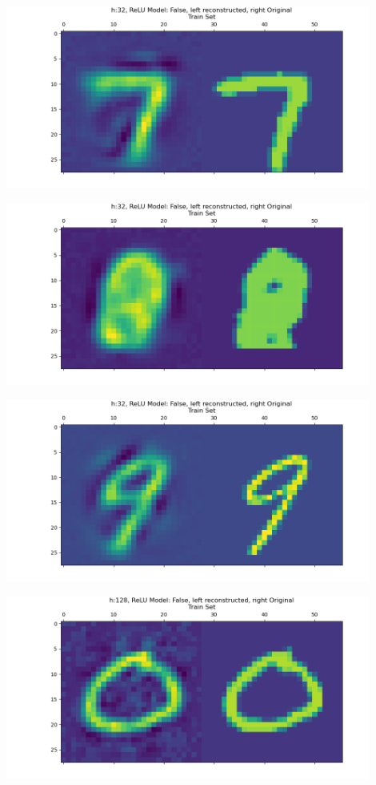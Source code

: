 \documentclass[]{article}
\begin{document}
            \begin{center}
                \includegraphics*[width=12cm]{./A4plots/06-39-50-h-32-lin-digit-7.png}
            \end{center}
            \begin{center}
                \includegraphics*[width=12cm]{./A4plots/06-39-50-h-32-lin-digit-8.png}
            \end{center}
            \begin{center}
                \includegraphics*[width=12cm]{./A4plots/06-39-50-h-32-lin-digit-9.png}
            \end{center}
            \begin{center}
                \includegraphics*[width=12cm]{./A4plots/06-46-47-h-128-lin-digit-0.png}
            \end{center}
\end{document}

